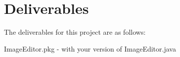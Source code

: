\section{Deliverables}

The deliverables for this project are as follows:

	ImageEditor.pkg - with your version of ImageEditor.java\\
